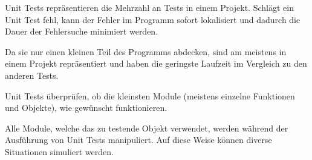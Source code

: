 Unit Tests repräsentieren die Mehrzahl an Tests in einem Projekt. Schlägt ein Unit Test fehl, 
kann der Fehler im Programm sofort lokalisiert und dadurch die Dauer der Fehlersuche minimiert werden.

Da sie nur einen kleinen Teil des Programms abdecken, 
sind am meistens in einem Projekt repräsentiert und haben die geringste Laufzeit im Vergleich zu den anderen Tests.

Unit Tests überprüfen, ob die kleinsten Module (meistens einzelne Funktionen und Objekte), 
wie gewünscht funktionieren. 

Alle Module, welche das zu testende Objekt verwendet, werden während der Ausführung von Unit Tests manipuliert.
Auf diese Weise können diverse Situationen simuliert werden.